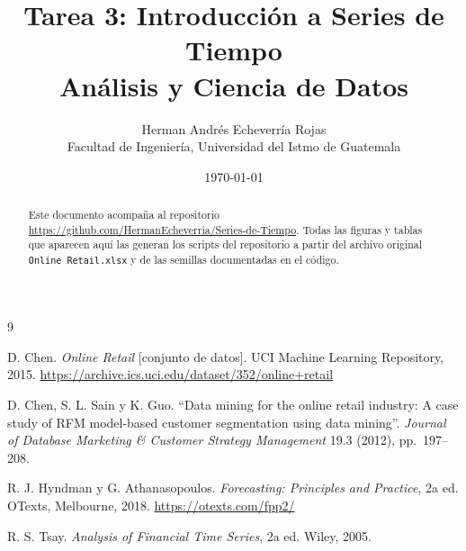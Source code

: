 \documentclass[11pt]{article}
\title{Tarea 3: Introducción a Series de Tiempo\\
       \large Análisis y Ciencia de Datos}
\author{Herman Andrés Echeverría Rojas\\
        \small Facultad de Ingeniería, Universidad del Istmo de Guatemala}
\date{\today}
\begin{document}
\maketitle

\begin{abstract}
\noindent
Este documento acompaña al repositorio\\
\url{https://github.com/HermanEcheverria/Series-de-Tiempo}.
Todas las figuras y tablas que aparecen aquí las generan los scripts del
repositorio a partir del archivo original \texttt{Online Retail.xlsx} y de las
semillas documentadas en el código.
\end{abstract}

\tableofcontents
\newpage









\begin{thebibliography}{9}

  D. Chen. \emph{Online Retail} [conjunto de datos].
  UCI Machine Learning Repository, 2015.
  \url{https://archive.ics.uci.edu/dataset/352/online+retail}

  D. Chen, S. L. Sain y K. Guo. ``Data mining for the online retail industry:
  A case study of RFM model-based customer segmentation using data mining''.
  \emph{Journal of Database Marketing \& Customer Strategy Management}
  19.3 (2012), pp.~197--208.

  R. J. Hyndman y G. Athanasopoulos. \emph{Forecasting: Principles and
  Practice}, 2a ed. OTexts, Melbourne, 2018.
  \url{https://otexts.com/fpp2/}

  R. S. Tsay. \emph{Analysis of Financial Time Series}, 2a ed. Wiley, 2005.

\end{thebibliography}
\end{document}
